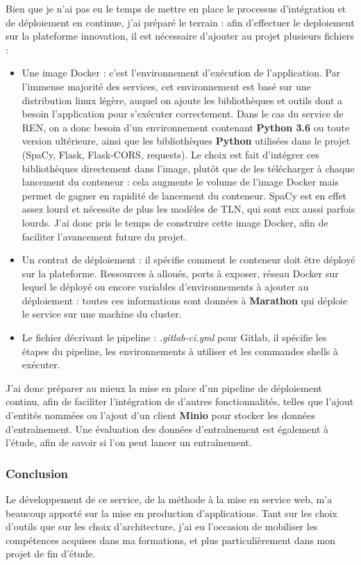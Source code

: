Bien que je n'ai pas eu le temps de mettre en place le processus d'intégration et de déploiement en continue, j'ai préparé le terrain : afin d'effectuer le deploiement sur la plateforme innovation, il est nécessaire d'ajouter au projet plusieurs fichiers :
\vspace{5pt}
\begin{itemize}
    \item Une image Docker : c'est l'environnement d'exécution de l'application. Par l'immense majorité des services, cet environnement est basé sur une distribution linux légère, auquel on ajoute les bibliothèques et outils dont a besoin l'application pour s'exécuter correctement. Dans le cas du service de REN, on a donc besoin d'un environnement contenant \textbf{Python 3.6} ou toute version ultérieure, ainsi que les bibliothèques \textbf{Python} utilisées dans le projet (SpaCy, Flask, Flask-CORS, requests). Le choix est fait d'intégrer ces bibliothèques directement dans l'image, plutôt que de les télécharger à chaque lancement du conteneur : cela augmente le volume de l'image Docker mais permet de gagner en rapidité de lancement du conteneur. SpaCy est en effet assez lourd et nécessite de plus les modèles de TLN, qui sont eux aussi parfois lourds. J'ai donc pris le temps de construire cette image Docker, afin de faciliter l'avancement future du projet.
    \vspace{5pt}
    \item Un contrat de déploiement : il spécifie comment le conteneur doit être déployé sur la plateforme. Ressources à alloués, ports à exposer, réseau Docker sur lequel le déployé ou encore variables d'environnements à ajouter au déploiement : toutes ces informations sont données à \textbf{Marathon} qui déploie le service sur une machine du cluster. 
    \vspace{5pt}
    \item Le fichier décrivant le pipeline : \textit{.gitlab-ci.yml} pour Gitlab, il spécifie les étapes du pipeline, les environnements à utiliser et les commandes shells à exécuter.
    \newline
\end{itemize}

J'ai donc préparer au mieux la mise en place d'un pipeline de déploiement continu, afin de faciliter l'intégration de d'autres fonctionnalités, telles que l'ajout d'entités nommées ou l'ajout d'un client \textbf{Minio} pour stocker les données d'entraînement. Une évaluation des données d'entraînement est également à l'étude, afin de savoir si l'on peut lancer un entraînement.
\label{section 3.2.3}

\subsubsection*{Conclusion}
Le développement de ce service, de la méthode à la mise en service web, m'a beaucoup apporté sur la mise en production d'applications. Tant sur les choix d'outils que sur les choix d'architecture, j'ai eu l'occasion de mobiliser les compétences acquises dans ma formations, et plus particulièrement dans mon projet de fin d'étude.
